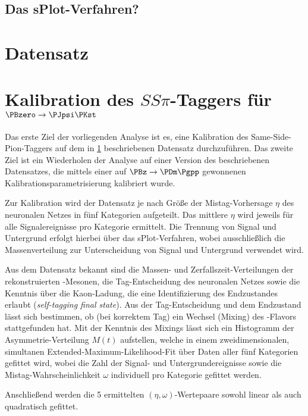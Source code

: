 \subsection{Das sPlot-Verfahren?}

\section{Datensatz}
\label{datensatz}


\section{\texorpdfstring{Kalibration des $SS\pi$-Taggers für $\PBzero \to \PJpsi \PKst$}{Kalibration des SSpi-Taggers für B0 -> JpsiKst}}

Das erste Ziel der vorliegenden Analyse ist es, eine Kalibration des Same-Side-Pion-Taggers auf dem in \ref{datensatz} beschriebenen Datensatz durchzuführen.
Das zweite Ziel ist ein Wiederholen der Analyse auf einer Version des beschriebenen Datensatzes, die mittels einer auf $\PBz \to \PDm\Pgpp$ gewonnenen Kalibrationsparametrisierung kalibriert wurde.

Zur Kalibration wird der Datensatz je nach Größe der Mistag-Vorhersage $η$ des neuronalen Netzes in fünf Kategorien aufgeteilt.
Das mittlere $η$ wird jeweils für alle Signalereignisse pro Kategorie ermittelt.
Die Trennung von Signal und Untergrund erfolgt hierbei über das sPlot-Verfahren\cite{splot}, wobei ausschließlich die Massenverteilung zur Unterscheidung von Signal und Untergrund verwendet wird.

Aus dem Datensatz bekannt sind die Massen- und Zerfallszeit-Verteilungen der rekonstruierten \PB-Mesonen, die Tag-Entscheidung des neuronalen Netzes sowie die Kenntnis über die Kaon-Ladung, die eine Identifizierung des Endzustandes erlaubt (\emph{self-tagging final state}).
Aus der Tag-Entscheidung und dem Endzustand lässt sich bestimmen, ob (bei korrektem Tag) ein Wechsel (Mixing) des \Pqb-Flavors stattgefunden hat.
Mit der Kenntnis des Mixings lässt sich ein Histogramm der Asymmetrie-Verteilung $M(t)$ aufstellen, welche in einem zweidimensionalen, simultanen Extended-Maximum-Likelihood-Fit über Daten aller fünf Kategorien gefittet wird, wobei die Zahl der Signal- und Untergrundereignisse sowie die Mistag-Wahrscheinlichkeit $ω$ individuell pro Kategorie gefittet werden.

Anschließend werden die 5 ermittelten $(η, ω)$-Wertepaare sowohl linear als auch quadratisch gefittet.

